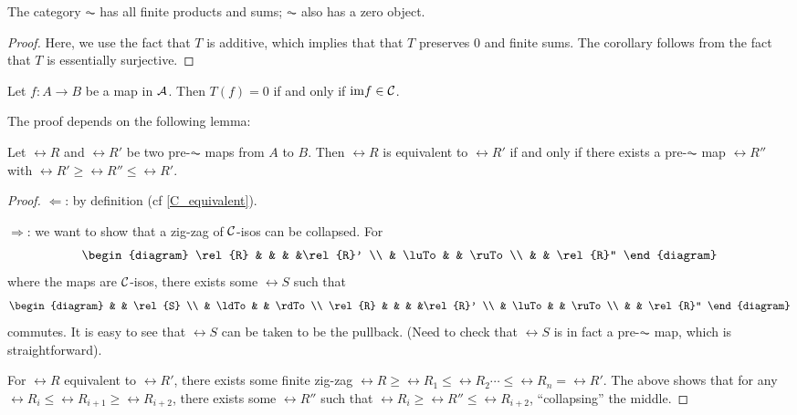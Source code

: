 \begin{cor}
The category $\AC$ has all finite products and sums; $\AC$ also 
has a zero object.
\end{cor}
\begin{proof}
Here, we use the fact that $T$ is additive, which implies that
that $T$ preserves $0$ and finite sums. The corollary follows from
the fact that $T$ is essentially surjective.
\end{proof}

\begin{lem}\label{lemma_2_10}
Let $f: A \to B$ be a map in $\mathcal{A}$. Then $T(f) = 0$ if and 
only if $\mathrm{im} f \in \mathcal{C}$.
\end{lem}

The proof depends on the following lemma:

\begin{lem}\label{lemma_2_11}
Let $\rel{R}$ and $\rel{R}'$ be two pre-$\AC$ maps from $A$ to $B$.
Then $\rel{R}$ is equivalent to $\rel{R}'$ if and only if there 
exists a pre-$\AC$ map $\rel{R}''$ with $\rel{R}' \geq \rel{R}'' 
\leq \rel{R}'$.
\end{lem}
\begin{proof}
\noindent $\Leftarrow$: by definition (cf \ref{C_equivalent}).

\noindent $\Rightarrow$: we want to show that a zig-zag of 
$\mathcal{C}$-isos can be collapsed. For
\[
\begin{diagram}
\rel{R} &       &           &       &\rel{R}' \\
        & \luTo &           & \ruTo \\
        &       & \rel{R}''
\end{diagram}
\]
where the maps are $\mathcal{C}$-isos, there exists some $\rel{S}$ 
such that
\[
\begin{diagram}
        &       & \rel{S}   \\
        & \ldTo &           & \rdTo \\
\rel{R} &       &           &       &\rel{R}' \\
        & \luTo &           & \ruTo \\
        &       & \rel{R}''
\end{diagram}
\]
commutes. It is easy to see that $\rel{S}$ can be taken to be
the pullback. (Need to check that $\rel{S}$ is in fact a pre-$\AC$
map, which is straightforward).

For $\rel{R}$ equivalent to $\rel{R}'$, there exists some finite
zig-zag $\rel{R} \geq \rel{R_1} \leq \rel{R_2} \cdots \leq 
\rel{R_n} = \rel{R}'$. The above shows that for any $\rel{R}_i 
\leq \rel{R}_{i + 1} \geq \rel{R}_{i + 2}$, there exists some
$\rel{R}''$ such that $\rel{R}_i \geq \rel{R}'' \leq 
\rel{R}_{i + 2}$, ``collapsing'' the middle.
\end{proof}

